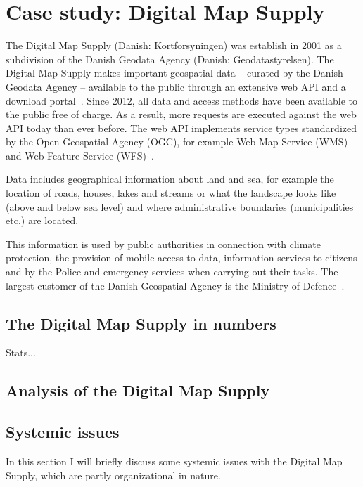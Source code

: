\section{Case study: Digital Map Supply}

The Digital Map Supply (Danish: Kortforsyningen) was establish in 2001 as a subdivision of the Danish Geodata Agency (Danish: Geodatastyrelsen). The Digital Map Supply makes important geospatial data -- curated by the Danish Geodata Agency -- available to the public through an extensive web API and a download portal~\cite{kortforsyningen}. Since 2012, all data and access methods have been available to the public free of charge. As a result, more requests are executed against the web API today than ever before. The web API implements service types standardized by the Open Geospatial Agency (OGC), for example Web Map Service (WMS) and Web Feature Service (WFS)~\cite{opengeospatialconsortium}.

Data includes geographical information about land and sea, for example the location of roads, houses, lakes and streams or what the landscape looks like (above and below sea level) and where administrative boundaries (municipalities etc.) are located. 

This information is used by public authorities in connection with climate protection, the provision of mobile access to data, information services to citizens and by the Police and emergency services when carrying out their tasks. The largest customer of the Danish Geospatial Agency is the Ministry of Defence~\cite{geodatastyrelsen}.

\subsection{The Digital Map Supply in numbers}

Stats...




\subsection{Analysis of the Digital Map Supply}



\subsection{Systemic issues}
\label{sec:systemic:issues}
In this section I will briefly discuss some systemic issues with the Digital Map Supply, which are partly organizational in nature.

